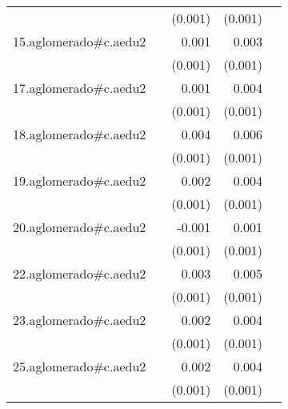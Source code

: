 {\begin{longtable}{l*{4}{D{.}{.}{-1}}}
            &                     &     (0.001)         &     (0.001)         &                     \\
\addlinespace
15.aglomerado#c.aedu2&                     &       0.001         &       0.003\sym{***}&                     \\
            &                     &     (0.001)         &     (0.001)         &                     \\
\addlinespace
17.aglomerado#c.aedu2&                     &       0.001         &       0.004\sym{***}&                     \\
            &                     &     (0.001)         &     (0.001)         &                     \\
\addlinespace
18.aglomerado#c.aedu2&                     &       0.004\sym{**} &       0.006\sym{***}&                     \\
            &                     &     (0.001)         &     (0.001)         &                     \\
\addlinespace
19.aglomerado#c.aedu2&                     &       0.002         &       0.004\sym{***}&                     \\
            &                     &     (0.001)         &     (0.001)         &                     \\
\addlinespace
20.aglomerado#c.aedu2&                     &      -0.001         &       0.001         &                     \\
            &                     &     (0.001)         &     (0.001)         &                     \\
\addlinespace
22.aglomerado#c.aedu2&                     &       0.003\sym{*}  &       0.005\sym{***}&                     \\
            &                     &     (0.001)         &     (0.001)         &                     \\
\addlinespace
23.aglomerado#c.aedu2&                     &       0.002         &       0.004\sym{***}&                     \\
            &                     &     (0.001)         &     (0.001)         &                     \\
\addlinespace
25.aglomerado#c.aedu2&                     &       0.002         &       0.004\sym{***}&                     \\
            &                     &     (0.001)         &     (0.001)         &                     \\

\end{longtable}}
